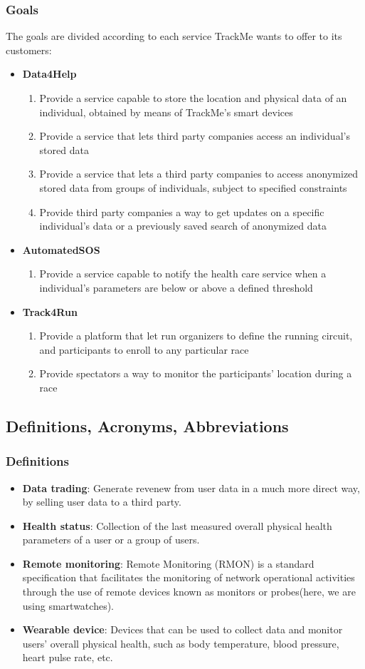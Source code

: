 \documentclass[12pt]{article}
\newcommand\goal[1]{\item[{[G#1]}] }
\begin{document}
\subsubsection{Goals}
The goals are divided according to each service TrackMe wants to offer to its customers:
\begin{itemize}
\item{\textbf{Data4Help}}
\begin{enumerate}
\goal{1} Provide a service capable to store the location and physical data of an individual, obtained by means of TrackMe's smart devices
\goal{2} Provide a service that lets third party companies access an individual's stored data 
\goal{3} Provide a service that lets a third party companies to access anonymized stored data from groups of individuals, subject to specified constraints
\goal{4} Provide third party companies a way to get updates on a specific individual's data or a previously saved search of anonymized data
\end{enumerate}
\item{\textbf{AutomatedSOS}}
\begin{enumerate}
\goal{5} Provide a service capable to notify the health care service when a individual's parameters are below or above a defined threshold
\end{enumerate}
\item{\textbf{Track4Run}}
\begin{enumerate}
\goal{6} Provide a platform that let run organizers to define the running circuit, and participants to enroll to any particular race
\goal{7} Provide spectators a way to monitor the participants' location during a race
\end{enumerate}
\end{itemize}

\subsection{Definitions, Acronyms, Abbreviations}
\subsubsection{Definitions}
\begin{itemize}
\item{\textbf{Data trading}}: Generate revenew from user data in a much more direct way, by selling user data to a third party.
\item{\textbf{Health status}}: Collection of the last measured overall physical health parameters of a user or a group of users.
\item{\textbf{Remote monitoring}}: Remote Monitoring (RMON) is a standard specification that facilitates the monitoring of network operational activities through the use of remote devices known as monitors or probes(here, we are using smartwatches).
\item{\textbf{Wearable device}}: Devices that can be used to collect data and monitor users' overall physical health, such as body temperature, blood pressure, heart pulse rate, etc.

\end{itemize}
\end{document}
